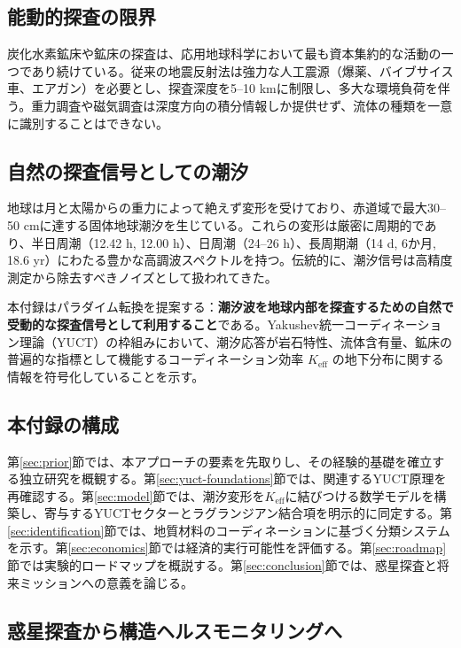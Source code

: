 \documentclass[12pt,a4paper]{article}
\theoremstyle{remark}
\newcommand{\Keff}{K_{\mathrm{eff}}}
\begin{document}
	\subsection{能動的探査の限界}
	
	炭化水素鉱床や鉱床の探査は、応用地球科学において最も資本集約的な活動の一つであり続けている。従来の地震反射法は強力な人工震源（爆薬、バイブサイス車、エアガン）を必要とし、探査深度を5–10 kmに制限し、多大な環境負荷を伴う。重力調査や磁気調査は深度方向の積分情報しか提供せず、流体の種類を一意に識別することはできない。
	
	\subsection{自然の探査信号としての潮汐}
	
	地球は月と太陽からの重力によって絶えず変形を受けており、赤道域で最大30–50 cmに達する固体地球潮汐を生じている。これらの変形は厳密に周期的であり、半日周潮（12.42 h, 12.00 h）、日周潮（24–26 h）、長周期潮（14 d, 6か月, 18.6 yr）にわたる豊かな高調波スペクトルを持つ。伝統的に、潮汐信号は高精度測定から除去すべきノイズとして扱われてきた。
	
	本付録はパラダイム転換を提案する：\textbf{潮汐波を地球内部を探査するための自然で受動的な探査信号として利用すること}である。Yakushev統一コーディネーション理論（YUCT）の枠組みにおいて、潮汐応答が岩石特性、流体含有量、鉱床の普遍的な指標として機能するコーディネーション効率 \(\Keff\) の地下分布に関する情報を符号化していることを示す。
	
	\subsection{本付録の構成}
	
	第\ref{sec:prior}節では、本アプローチの要素を先取りし、その経験的基礎を確立する独立研究を概観する。第\ref{sec:yuct-foundations}節では、関連するYUCT原理を再確認する。第\ref{sec:model}節では、潮汐変形を\(\Keff\)に結びつける数学モデルを構築し、寄与するYUCTセクターとラグランジアン結合項を明示的に同定する。第\ref{sec:identification}節では、地質材料のコーディネーションに基づく分類システムを示す。第\ref{sec:economics}節では経済的実行可能性を評価する。第\ref{sec:roadmap}節では実験的ロードマップを概説する。第\ref{sec:conclusion}節では、惑星探査と将来ミッションへの意義を論じる。
	
	\subsection{惑星探査から構造ヘルスモニタリングへ}
	\label{sec:beyond-geophysics}
	
\end{document}
